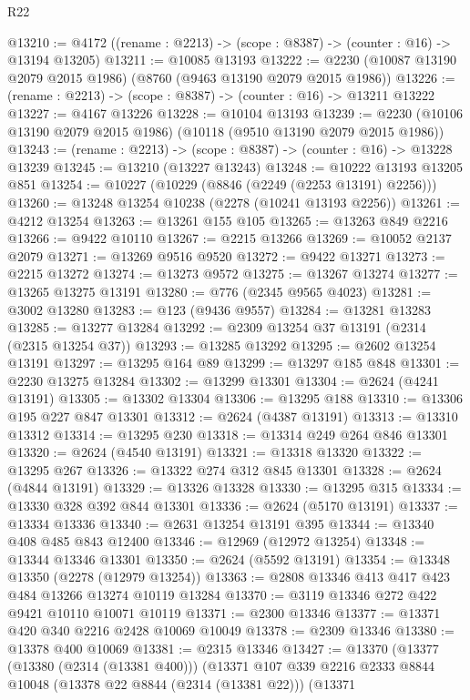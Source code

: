 \begin{lexlean}{R22}
\begin{coremodule}
@13210 := @4172 ((rename : @2213) -> (scope : @8387) -> (counter : @16) -> @13194 @13205)
@13211 := @10085 @13193
@13222 := @2230 (@10087 @13190 @2079 @2015 @1986) (@8760 (@9463 @13190 @2079 @2015 @1986))
@13226 := (rename : @2213) -> (scope : @8387) -> (counter : @16) -> @13211 @13222
@13227 := @4167 @13226
@13228 := @10104 @13193
@13239 := @2230 (@10106 @13190 @2079 @2015 @1986) (@10118 (@9510 @13190 @2079 @2015 @1986))
@13243 := (rename : @2213) -> (scope : @8387) -> (counter : @16) -> @13228 @13239
@13245 := @13210 (@13227 @13243)
@13248 := @10222 @13193 @13205 @851
@13254 := @10227 (@10229 (@8846 (@2249 (@2253 @13191) @2256)))
@13260 := @13248 @13254 @10238 (@2278 (@10241 @13193 @2256))
@13261 := @4212 @13254
@13263 := @13261 @155 @105
@13265 := @13263 @849 @2216
@13266 := @9422 @10110
@13267 := @2215 @13266
@13269 := @10052 @2137 @2079
@13271 := @13269 @9516 @9520
@13272 := @9422 @13271
@13273 := @2215 @13272
@13274 := @13273 @9572
@13275 := @13267 @13274
@13277 := @13265 @13275 @13191
@13280 := @776 (@2345 @9565 @4023)
@13281 := @3002 @13280
@13283 := @123 (@9436 @9557)
@13284 := @13281 @13283
@13285 := @13277 @13284
@13292 := @2309 @13254 @37 @13191 (@2314 (@2315 @13254 @37))
@13293 := @13285 @13292
@13295 := @2602 @13254 @13191
@13297 := @13295 @164 @89
@13299 := @13297 @185 @848
@13301 := @2230 @13275 @13284
@13302 := @13299 @13301
@13304 := @2624 (@4241 @13191)
@13305 := @13302 @13304
@13306 := @13295 @188
@13310 := @13306 @195 @227 @847 @13301
@13312 := @2624 (@4387 @13191)
@13313 := @13310 @13312
@13314 := @13295 @230
@13318 := @13314 @249 @264 @846 @13301
@13320 := @2624 (@4540 @13191)
@13321 := @13318 @13320
@13322 := @13295 @267
@13326 := @13322 @274 @312 @845 @13301
@13328 := @2624 (@4844 @13191)
@13329 := @13326 @13328
@13330 := @13295 @315
@13334 := @13330 @328 @392 @844 @13301
@13336 := @2624 (@5170 @13191)
@13337 := @13334 @13336
@13340 := @2631 @13254 @13191 @395
@13344 := @13340 @408 @485 @843 @12400
@13346 := @12969 (@12972 @13254)
@13348 := @13344 @13346 @13301
@13350 := @2624 (@5592 @13191)
@13354 := @13348 @13350 (@2278 (@12979 @13254))
@13363 := @2808 @13346 @413 @417 @423 @484 @13266 @13274 @10119 @13284
@13370 := @3119 @13346 @272 @422 @9421 @10110 @10071 @10119
@13371 := @2300 @13346
@13377 := @13371 @420 @340 @2216 @2428 @10069 @10049
@13378 := @2309 @13346
@13380 := @13378 @400 @10069
@13381 := @2315 @13346
@13427 := @13370
    (@13377
      (@13380 (@2314 (@13381 @400)))
      (@13371
        @107
        @339
        @2216
        @2333
        @8844
        @10048
        (@13378 @22 @8844 (@2314 (@13381 @22)))
        (@13371

\end{coremodule}
\end{lexlean}
